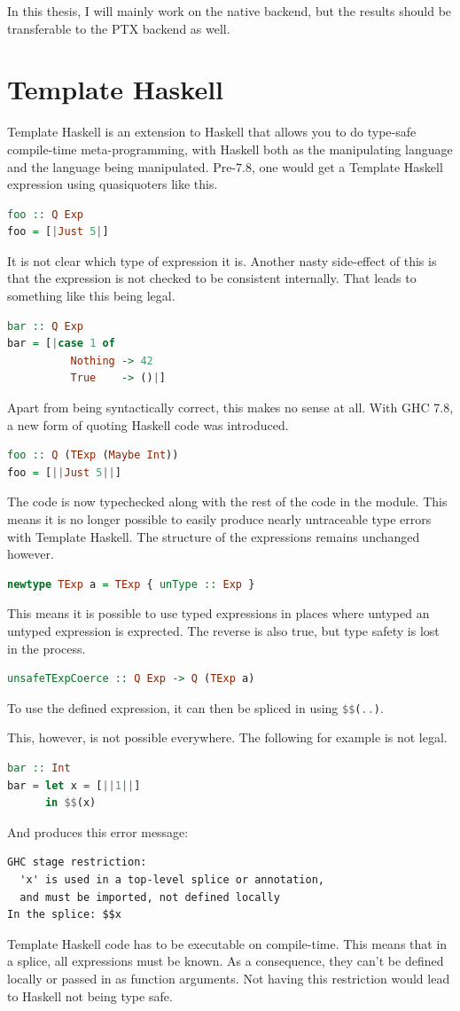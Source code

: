 \documentclass[a4paper,bibliography=totocnumbered,parskip,headsepline]{scrbook}
\begin{document}
In this thesis, I will mainly work on the native backend, but the results should be transferable to the PTX backend as well.

\section{Template Haskell}
Template Haskell is an extension to Haskell that allows you to do type-safe compile-time meta-programming, with Haskell both as the manipulating language and the language being manipulated.
Pre-7.8, one would get a Template Haskell expression using quasiquoters like this.
\begin{lstlisting}[language=haskell]
foo :: Q Exp
foo = [|Just 5|]
\end{lstlisting}
It is not clear which type of expression it is.
Another nasty side-effect of this is that the expression is not checked to be consistent internally.
That leads to something like this being legal.
\begin{lstlisting}[language=haskell]
bar :: Q Exp
bar = [|case 1 of
          Nothing -> 42
          True    -> ()|]
\end{lstlisting}
Apart from being syntactically correct, this makes no sense at all.
With GHC 7.8, a new form of quoting Haskell code was introduced.
\begin{lstlisting}[language=haskell]
foo :: Q (TExp (Maybe Int))
foo = [||Just 5||]
\end{lstlisting}
The code is now typechecked along with the rest of the code in the module.
This means it is no longer possible to easily produce nearly untraceable type errors with Template Haskell.
The structure of the expressions remains unchanged however.
\begin{lstlisting}[language=haskell]
newtype TExp a = TExp { unType :: Exp }
\end{lstlisting}
This means it is possible to use typed expressions in places where untyped an untyped expression is exprected.
The reverse is also true, but type safety is lost in the process.
\begin{lstlisting}[language=haskell]
unsafeTExpCoerce :: Q Exp -> Q (TExp a)
\end{lstlisting}
To use the defined expression, it can then be spliced in using \lstinline[language=haskell]{$$(..)}.

This, however, is not possible everywhere.
The following for example is not legal.
\begin{lstlisting}[language=haskell]
bar :: Int
bar = let x = [||1||]
      in $$(x)
\end{lstlisting}
And produces this error message:
\begin{verbatim}
GHC stage restriction:
  'x' is used in a top-level splice or annotation,
  and must be imported, not defined locally
In the splice: $$x
\end{verbatim}
Template Haskell code has to be executable on compile-time.
This means that in a splice, all expressions must be known.
As a consequence, they can't be defined locally or passed in as function arguments.
Not having this restriction would lead to Haskell not being type safe.
\end{document}
